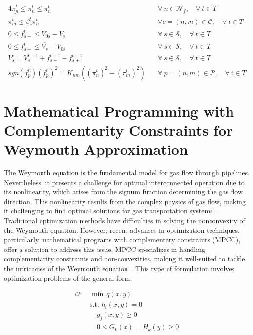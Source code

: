 \begin{alignat}{4}
    \underline{\pi_{n}^t} \leq \pi_{n}^t \leq \overline{\pi_{n}^t} &\quad \forall \ n \in \mathcal{N}_f, \quad \forall \ t \in T \label{eq:press_limit} \\
    \pi_{m}^t \leq \beta_{c}^t{\pi_{n}^t} &\quad \forall c=(n,m) \in \mathcal{C}, \quad \forall \ t \in T \label{eq:comp_ratio} \\
    0 \leq f_{s+}^t \leq V_{0s} - \underline{V_s} &\quad \forall \ s \in \mathcal{S} , \quad \forall \ t \in T \label{eq:sto_limit1} \\ 
    0 \leq f_{s-}^t \leq \overline{V_s} - V_{0s} &\quad \forall \ s \in \mathcal{S}, \quad \forall \ t \in T \label{eq:sto_limit2} \\ 
    V_{s}^t = V_{s}^{t-1} + f_{s-}^{t-1} - f_{s+}^{t-1} &\quad \forall \ s \in \mathcal{S}, \quad \forall \ t \in T \label{eq:sto_time}\\
    sgn(f_{p}^t)(f_{p}^t)^2 = K_{nm}((\pi_{n}^t)^2-(\pi_{m}^t)^2) &\quad \forall \ p =(n,m) \in\mathcal{P}, \quad \forall \ t \in T \label{eq:weymouth_constraint}
\end{alignat}


\section{Mathematical Programming with Complementarity Constraints for Weymouth Approximation} \label{sec:mpcc}

The Weymouth equation is the fundamental model for gas flow through pipelines. Nevertheless, it presents a challenge for optimal interconnected operation due to its nonlinearity, which arises from the signum function determining the gas flow direction. This nonlinearity results from the complex physics of gas flow, making it challenging to find optimal solutions for gas transportation systems~\citep{weymouth_nonconvex}. Traditional optimization methods have difficulties in solving the nonconvexity of the Weymouth equation. However, recent advances in optimization techniques, particularly mathematical programs with complementary constraints (MPCC), offer a solution to address this issue. MPCC specializes in handling complementarity constraints and non-convexities, making it well-suited to tackle the intricacies of the Weymouth equation~\citep{baumrucker_renfro_biegler_2008}. This type of formulation involves optimization problems of the general form:


\begin{subequations}
\begin{alignat}{4}
\mathcal{O}: \ &\min \ q(x, y) \\
&\text{s.t. } h_i(x, y) = 0 \\
&\quad g_j(x, y) \geq 0 \\
&\quad 0 \leq G_k(x) \perp H_k(y) \geq 0 \label{eq:complementarity}
\end{alignat}
\end{subequations}



